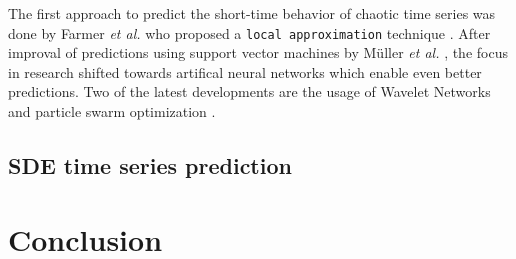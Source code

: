 \documentclass{article}
\begin{document}
The first approach to predict the short-time behavior of chaotic time series
was done by Farmer \textit{et al.} who proposed a \texttt{local approximation}
technique \cite{farmer1987}. After improval of predictions using support vector
machines by Müller \textit{et al.} \cite{muller1997}, the focus in research
shifted towards artifical neural networks which enable even better predictions.
Two of the latest developments are the usage of Wavelet Networks
\cite{alexandridis2013} and particle swarm optimization \cite{caraballo2016}.


\subsection{SDE time series prediction}
    
\section{Conclusion}



\end{document}
